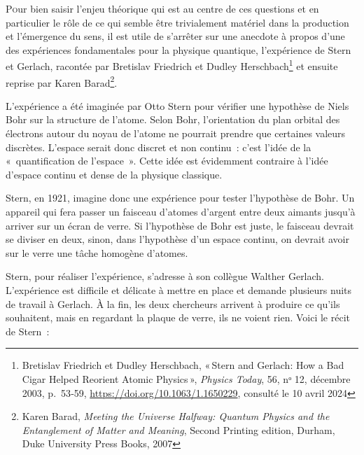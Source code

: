 \lettrine{P}our bien saisir l'enjeu théorique qui est au centre de ces
questions et en particulier le rôle de ce qui semble être trivialement
matériel dans la production et l'émergence du sens, il est utile de
s'arrêter sur une anecdote à propos d'une des expériences fondamentales
pour la physique quantique, l'expérience de Stern et Gerlach, racontée
par Bretislav Friedrich et Dudley Herschbach\footnote{Bretislav
  Friedrich et Dudley Herschbach, {«\,Stern and {Gerlach}: {How} a {Bad}
  {Cigar} {Helped} {Reorient} {Atomic} {Physics}\,»}, \emph{Physics
  Today}, 56, nᵒ 12, décembre 2003, p.~53‑59,
  \url{https://doi.org/10.1063/1.1650229}, consulté le 10 avril 2024} et
ensuite reprise par Karen Barad\footnote{Karen Barad, \emph{Meeting the
  {Universe} {Halfway}: {Quantum} {Physics} and the {Entanglement} of
  {Matter} and {Meaning}}, Second Printing edition, Durham, Duke
  University Press Books, 2007}.

L'expérience a été imaginée par Otto Stern pour vérifier une hypothèse
de Niels Bohr sur la structure de l'atome. Selon Bohr, l'orientation du
plan orbital des électrons autour du noyau de l'atome ne pourrait
prendre que certaines valeurs discrètes. L'espace serait donc discret et
non continu~: c'est l'idée de la «~quantification de l'espace~». Cette
idée est évidemment contraire à l'idée d'espace continu et dense de la
physique classique.

Stern, en 1921, imagine donc une expérience pour tester l'hypothèse de
Bohr. Un appareil qui fera passer un faisceau d'atomes d'argent entre
deux aimants jusqu'à arriver sur un écran de verre. Si l'hypothèse de
Bohr est juste, le faisceau devrait se diviser en deux, sinon, dans
l'hypothèse d'un espace continu, on devrait avoir sur le verre une tâche
homogène d'atomes.

Stern, pour réaliser l'expérience, s'adresse à son collègue Walther
Gerlach. L'expérience est difficile et délicate à mettre en place et
demande plusieurs nuits de travail à Gerlach. À la fin, les deux
chercheurs arrivent à produire ce qu'ils souhaitent, mais en regardant
la plaque de verre, ils ne voient rien. Voici le récit de Stern~:

